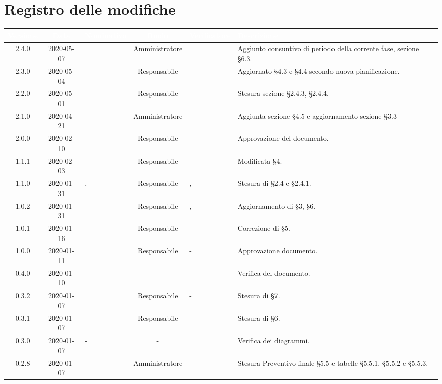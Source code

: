 \section*{Registro delle modifiche}
\setcounter{table}{-1}
{
\renewcommand{\arraystretch}{1.5}
\centering
\begin{longtable}{ c c  C{2.3cm} c C{3cm} C{3.2cm}}
\textcolor{white}{\textbf{Versione}} &
\textcolor{white}{\textbf{Data}}&
\textcolor{white}{\textbf{Nominativo}}&
\textcolor{white}{\textbf{Ruolo}}&
\textcolor{white}{\textbf{Verificatore}}&
\textcolor{white}{\textbf{Descrizione}}\\
\endhead

2.4.0 & 2020-05-07 & \MC{} & Amministratore & \AT{} & Aggiunto consuntivo di periodo della corrente fase, sezione §6.3. \\
2.3.0 & 2020-05-04 & \AT{} & Responsabile & \MC{} & Aggiornato §4.3 e §4.4 secondo nuova pianificazione. \\
2.2.0 & 2020-05-01 & \AT{} & Responsabile & \MC{} & Stesura sezione §2.4.3, §2.4.4. \\
2.1.0 & 2020-04-21 & \MC{} & Amministratore & \AT{} & Aggiunta sezione §4.5 e aggiornamento sezione §3.3 \\
2.0.0 & 2020-02-10 & \MC{} & Responsabile & - & Approvazione del documento. \\
1.1.1 & 2020-02-03 & \MC{} & Responsabile & \PF{} & Modificata §4. \\
1.1.0 & 2020-01-31 & \MC{}, \AT{} & Responsabile & \PF{}, \newline \SE{} & Stesura di §2.4 e §2.4.1. \\
1.0.2 & 2020-01-31 & \AT{} & Responsabile & \PF{}, \newline \SE{} & Aggiornamento di §3, §6. \\
1.0.1 & 2020-01-16 & \SE{} & Responsabile & \PF{} & Correzione di §5. \\
1.0.0 & 2020-01-11 & \SE{} & Responsabile & - & Approvazione documento. \\
0.4.0 & 2020-01-10 & - & - & \AT{} & Verifica del documento. \\
0.3.2 & 2020-01-07 & \SE{} & Responsabile & - & Stesura di §7. \\
0.3.1 & 2020-01-07 & \SE{} & Responsabile & - & Stesura di §6. \\
0.3.0 & 2020-01-07 & - & - & \MC{} & Verifica dei diagrammi. \\
0.2.8 & 2020-01-07 & \LD{} & Amministratore & - & Stesura Preventivo finale §5.5 e tabelle §5.5.1, §5.5.2 e §5.5.3. \\

\end{longtable}}
